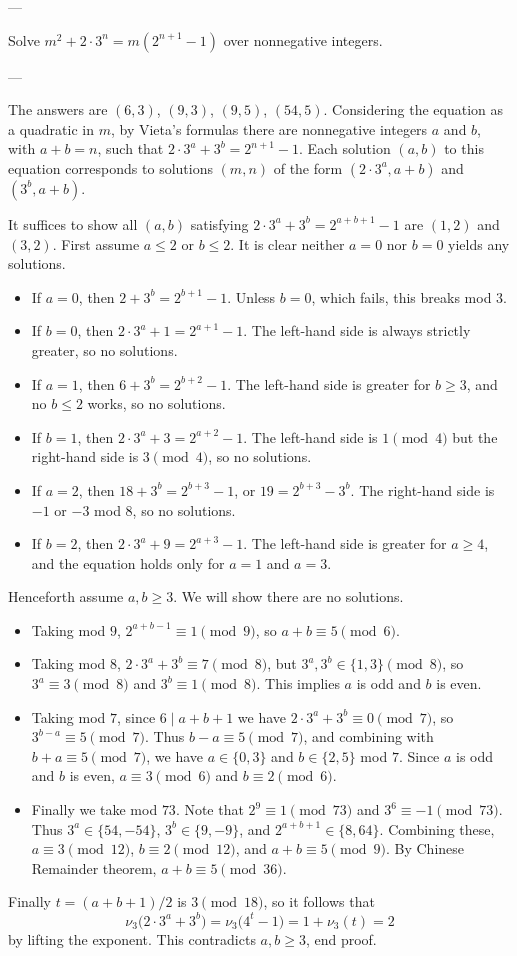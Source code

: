 
---

Solve $m^2+2\cdot3^n=m\left(2^{n+1}-1\right)$ over nonnegative integers.

---

The answers are $(6,3)$, $(9,3)$, $(9,5)$, $(54,5)$. Considering the equation as a quadratic in $m$, by Vieta's formulas there are nonnegative integers $a$ and $b$, with $a+b=n$, such that $2\cdot3^a+3^b=2^{n+1}-1$. Each solution $(a,b)$ to this equation corresponds to solutions $(m,n)$ of the form $(2\cdot3^a,a+b)$ and $(3^b,a+b)$.

It suffices to show all $(a,b)$ satisfying $2\cdot3^a+3^b=2^{a+b+1}-1$ are $(1,2)$ and $(3,2)$. First assume $a\le2$ or $b\le2$. It is clear neither $a=0$ nor $b=0$ yields any solutions.
\begin{itemize}
    \item If $a=0$, then $2+3^b=2^{b+1}-1$. Unless $b=0$, which fails, this breaks mod $3$.
    \item If $b=0$, then $2\cdot3^a+1=2^{a+1}-1$. The left-hand side is always strictly greater, so no solutions.
    \item If $a=1$, then $6+3^b=2^{b+2}-1$. The left-hand side is greater for $b\ge3$, and no $b\le2$ works, so no solutions.
    \item If $b=1$, then $2\cdot3^a+3=2^{a+2}-1$. The left-hand side is $1\pmod4$ but the right-hand side is $3\pmod4$, so no solutions.
    \item If $a=2$, then $18+3^b=2^{b+3}-1$, or $19=2^{b+3}-3^b$. The right-hand side is $-1$ or $-3$ mod $8$, so no solutions.
    \item If $b=2$, then $2\cdot3^a+9=2^{a+3}-1$. The left-hand side is greater for $a\ge4$, and the equation holds only for $a=1$ and $a=3$.
\end{itemize}
Henceforth assume $a,b\ge3$. We will show there are no solutions.
\begin{itemize}
    \item Taking mod $9$, $2^{a+b-1}\equiv1\pmod9$, so $a+b\equiv5\pmod6$.
    \item Taking mod $8$, $2\cdot3^a+3^b\equiv7\pmod8$, but $3^a,3^b\in\{1,3\}\pmod8$, so $3^a\equiv3\pmod8$ and $3^b\equiv1\pmod8$. This implies $a$ is odd and $b$ is even.
    \item Taking mod $7$, since $6\mid a+b+1$ we have $2\cdot3^a+3^b\equiv0\pmod7$, so $3^{b-a}\equiv5\pmod7$. Thus $b-a\equiv5\pmod7$, and combining with $b+a\equiv5\pmod7$, we have $a\in\{0,3\}$ and $b\in\{2,5\}$ mod $7$. Since $a$ is odd and $b$ is even, $a\equiv3\pmod6$ and $b\equiv2\pmod6$.
    \item Finally we take mod $73$. Note that $2^9\equiv1\pmod{73}$ and $3^6\equiv-1\pmod{73}$. Thus $3^a\in\{54,-54\}$, $3^b\in\{9,-9\}$, and $2^{a+b+1}\in\{8,64\}$. Combining these, $a\equiv3\pmod{12}$, $b\equiv2\pmod{12}$, and $a+b\equiv5\pmod9$. By Chinese Remainder theorem, $a+b\equiv5\pmod{36}$.
\end{itemize}
Finally $t=(a+b+1)/2$ is $3\pmod{18}$, so it follows that \[\nu_3\big(2\cdot3^a+3^b\big)=\nu_3\big(4^t-1\big)=1+\nu_3(t)=2\]
by lifting the exponent. This contradicts $a,b\ge3$, end proof.

